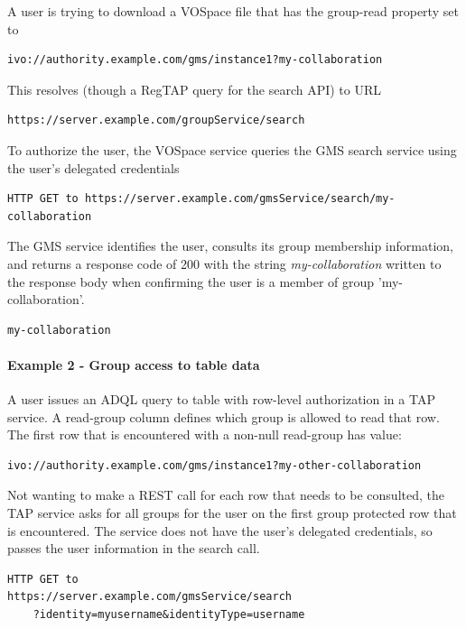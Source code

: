 \documentclass[11pt,a4paper]{ivoa}
\begin{document}
A user is trying to download a VOSpace file that has the group-read property set to

\begin{verbatim}
ivo://authority.example.com/gms/instance1?my-collaboration
\end{verbatim}

This resolves (though a RegTAP query for the search API) to URL

\begin{verbatim}
https://server.example.com/groupService/search
\end{verbatim}

To authorize the user, the VOSpace service queries the GMS search service using the user's delegated credentials

\begin{verbatim}
HTTP GET to https://server.example.com/gmsService/search/my-collaboration
\end{verbatim}

The GMS service identifies the user, consults its group membership information, and returns a response code of 200 with the string \emph{my-collaboration} written to the response body when confirming the user is a member of group 'my-collaboration'.

\begin{verbatim}
my-collaboration
\end{verbatim}

\paragraph{Example 2 - Group access to table data}

A user issues an ADQL query to table with row-level authorization in a TAP service.  A read-group column defines which group is allowed to read that row.  The first row that is encountered with a non-null read-group has value:

\begin{verbatim}
ivo://authority.example.com/gms/instance1?my-other-collaboration
\end{verbatim}

Not wanting to make a REST call for each row that needs to be consulted, the TAP service asks for all groups for the user on the first group protected row that is encountered.  The service does not have the user's delegated credentials, so passes the user information in the search call.

\begin{verbatim}
HTTP GET to
https://server.example.com/gmsService/search
    ?identity=myusername&identityType=username
\end{verbatim}
\end{document}
